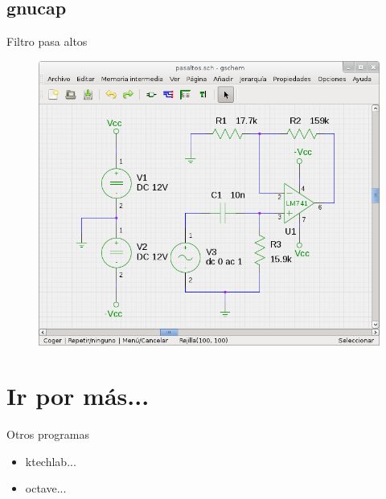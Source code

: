 \documentclass{beamer}
\begin{document}
\subsection[gnucap - \url{http://www.gnucap.org}]{gnucap}
\begin{frame}{Filtro pasa altos}
  \begin{figure}
    \centering
    \includegraphics[scale=0.4]{geda/img/gschem/gschem-pasaltos.png}
  \end{figure}
\end{frame}

\section{Ir por más...}

\begin{frame}{Otros programas}
  \begin{itemize}
  \item ktechlab... %
  \item octave...
  \end{itemize}
\end{frame}
\end{document}
